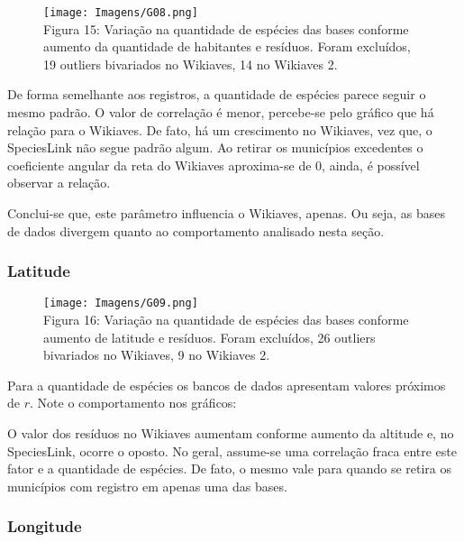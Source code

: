 \documentclass[12pt]{extarticle}
\newenvironment{resposta}{ \color{mygray}}{}
\begin{document}
 \newpage

\begin{figure}[h!]
\centering
\texttt{[image: Imagens/G08.png]}
\\{\scriptsize Figura 15: Variação na quantidade de espécies das bases conforme aumento da quantidade de habitantes e resíduos. Foram excluídos, 19 outliers bivariados no Wikiaves, 14 no Wikiaves 2.}
\end{figure}

\begin{resposta}
De forma semelhante aos registros, a quantidade de espécies parece seguir o mesmo padrão. O valor de correlação é menor, percebe-se pelo gráfico que há relação para o Wikiaves. De fato, há um crescimento no Wikiaves, vez que, o SpeciesLink não segue padrão algum. Ao retirar os municípios excedentes o coeficiente angular da reta do Wikiaves aproxima-se de 0, ainda, é possível observar a relação.

Conclui-se que, este parâmetro influencia o Wikiaves, apenas. Ou seja, as bases de dados divergem quanto ao comportamento analisado nesta seção.
\end{resposta}

\subsubsection{Latitude}

 

\begin{figure}[h!]
\centering
\texttt{[image: Imagens/G09.png]}
\\{\scriptsize Figura 16: Variação na quantidade de espécies das bases conforme aumento de latitude e resíduos. Foram excluídos, 26 outliers bivariados no Wikiaves, 9 no Wikiaves 2.}
\end{figure}

\begin{resposta}
Para a quantidade de espécies os bancos de dados apresentam valores próximos de $r$. Note o comportamento nos gráficos:

O valor dos resíduos no Wikiaves aumentam conforme aumento da altitude e, no SpeciesLink, ocorre o oposto. No geral, assume-se uma correlação fraca entre este fator e a quantidade de espécies. De fato, o mesmo vale para quando se retira os municípios com registro em apenas uma das bases.
\end{resposta}

\subsubsection{Longitude}
\end{document}
